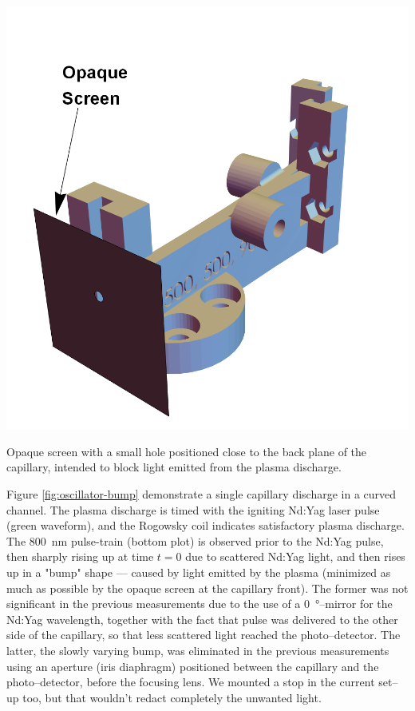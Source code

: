 \documentclass[../main.tex]{subfiles}
\begin{document}
\begin{marginfigure}
\includegraphics[width=\marginparwidth]{figures/cad/opaquescreen.png}
\caption{Opaque screen with a small hole positioned close to the back plane of the capillary, intended to block light emitted from the plasma discharge.}
\label{fig:opaque}
\end{marginfigure}

Figure \ref{fig:oscillator-bump} demonstrate a single capillary discharge in a curved channel. The plasma discharge is timed with the igniting Nd:Yag laser pulse (green waveform), and the Rogowsky coil indicates satisfactory plasma discharge. The \SI{800}{\nm} pulse-train (bottom plot) is observed prior to the Nd:Yag pulse, then sharply rising up at time $t=0$ due to scattered Nd:Yag light, and then rises up in a "bump" shape --- caused by light emitted by the plasma (minimized as much as possible by the opaque screen at the capillary front). The former was not significant in the previous measurements due to the use of a \SI{0}{\degree}--mirror for the Nd:Yag wavelength, together with the fact that pulse was delivered to the other side of the capillary, so that less scattered light reached the photo--detector. The latter, the slowly varying bump, was eliminated in the previous measurements using an aperture (iris diaphragm) positioned between the capillary and the photo--detector, before the focusing lens. We mounted a stop in the current set--up too, but that wouldn't redact completely the unwanted light.
\end{document}
